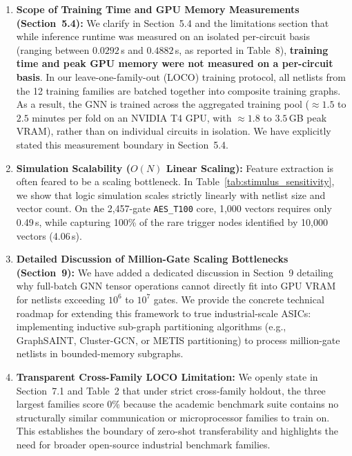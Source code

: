 \documentclass[11pt,a4paper]{article}
\begin{document}
\begin{enumerate}[leftmargin=*]
    \item \textbf{Scope of Training Time and GPU Memory Measurements (Section~5.4):}
    We clarify in Section~5.4 and the limitations section that while inference runtime was measured on an isolated per-circuit basis (ranging between $0.0292$\,s and $0.4882$\,s, as reported in Table~8), \textbf{training time and peak GPU memory were not measured on a per-circuit basis}. In our leave-one-family-out (LOCO) training protocol, all netlists from the 12 training families are batched together into composite training graphs. As a result, the GNN is trained across the aggregated training pool ($\approx 1.5$ to $2.5$ minutes per fold on an NVIDIA T4 GPU, with $\approx 1.8$ to $3.5$\,GB peak VRAM), rather than on individual circuits in isolation. We have explicitly stated this measurement boundary in Section~5.4.

    \item \textbf{Simulation Scalability ($O(N)$ Linear Scaling):} Feature extraction is often feared to be a scaling bottleneck. In Table~\ref{tab:stimulus_sensitivity}, we show that logic simulation scales strictly linearly with netlist size and vector count. On the 2,457-gate \texttt{AES\_T100} core, 1,000 vectors requires only 0.49\,s, while capturing 100\% of the rare trigger nodes identified by 10,000 vectors (4.06\,s).

    \item \textbf{Detailed Discussion of Million-Gate Scaling Bottlenecks (Section~9):} We have added a dedicated discussion in Section~9 detailing why full-batch GNN tensor operations cannot directly fit into GPU VRAM for netlists exceeding $10^6$ to $10^7$ gates. We provide the concrete technical roadmap for extending this framework to true industrial-scale ASICs: implementing inductive sub-graph partitioning algorithms (e.g., GraphSAINT, Cluster-GCN, or METIS partitioning) to process million-gate netlists in bounded-memory subgraphs.

    \item \textbf{Transparent Cross-Family LOCO Limitation:} We openly state in Section~7.1 and Table~2 that under strict cross-family holdout, the three largest families score 0\% because the academic benchmark suite contains no structurally similar communication or microprocessor families to train on. This establishes the boundary of zero-shot transferability and highlights the need for broader open-source industrial benchmark families.
\end{enumerate}
\end{document}
